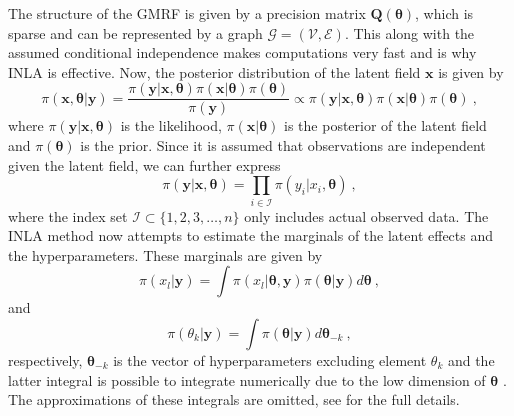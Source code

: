 The structure of the GMRF is given by a precision matrix $\mathbf{Q(\theta)}$, which is sparse and can be represented by a graph $\mathcal{G} = (\mathcal{V}, \mathcal{E})$. 
This along with the assumed conditional independence makes computations very fast and is why INLA is effective.
Now, the posterior distribution of the latent field $\boldsymbol{x}$ is given by
\begin{equation}
    \pi(\boldsymbol{x}, \boldsymbol{\theta} \lvert \mathbf{y}) = \frac{\pi(\mathbf{y} \lvert \boldsymbol{x}, \boldsymbol{\theta}) \pi(\boldsymbol{x} \lvert \boldsymbol{\theta}) \pi(\boldsymbol{\theta})}{\pi(\boldsymbol{y})} \propto \pi(\mathbf{y} \lvert \boldsymbol{x}, \boldsymbol{\theta}) \pi(\boldsymbol{x} \lvert \boldsymbol{\theta}) \pi(\boldsymbol{\theta}) \ ,
\end{equation}
where $\pi(\mathbf{y} \lvert \boldsymbol{x}, \boldsymbol{\theta})$ is the likelihood, $\pi(\boldsymbol{x} \lvert \boldsymbol{\theta})$ is the posterior of the latent field and $\pi(\boldsymbol{\theta})$ is the prior.
Since it is assumed that observations are independent given the latent field, we can further express
\begin{equation}
    \pi(\mathbf{y} \lvert \boldsymbol{x}, \boldsymbol{\theta}) = \prod_{i\in \mathcal{I}} \pi(y_i \lvert x_i, \boldsymbol{\theta}) \ ,
\end{equation}
where the index set $\mathcal{I} \subset \{1, 2, 3, \ldots, n\}$ only includes actual observed data. %
The INLA method now attempts to estimate the marginals of the latent effects and the hyperparameters. These marginals are given by
\begin{equation}
    \label{eq:INLA_marginals}
    \pi(x_l \lvert \mathbf{y}) = \int \pi(x_l \lvert \boldsymbol{\theta}, \mathbf{y}) \pi(\boldsymbol{\theta} \lvert \mathbf{y}) d\boldsymbol{\theta} \ ,
\end{equation}
and 
\begin{equation}
    \label{eq:INLA_marginals_hyperparameters}
    \pi(\theta_k \lvert \mathbf{y}) = \int \pi(\boldsymbol{\theta} \lvert \mathbf{y}) d\boldsymbol{\theta}_{-k} \ ,
\end{equation}
\citep{gomezrubio2020inla} respectively, $\boldsymbol{\theta}_{-k}$ is the vector of hyperparameters excluding element $\theta_k$ and the latter integral is possible to integrate numerically due to the low dimension of $\boldsymbol{\theta}$ \citep{rue2009inla}. The approximations of these integrals are omitted, see \citet{rue2009inla} for the full details. 

